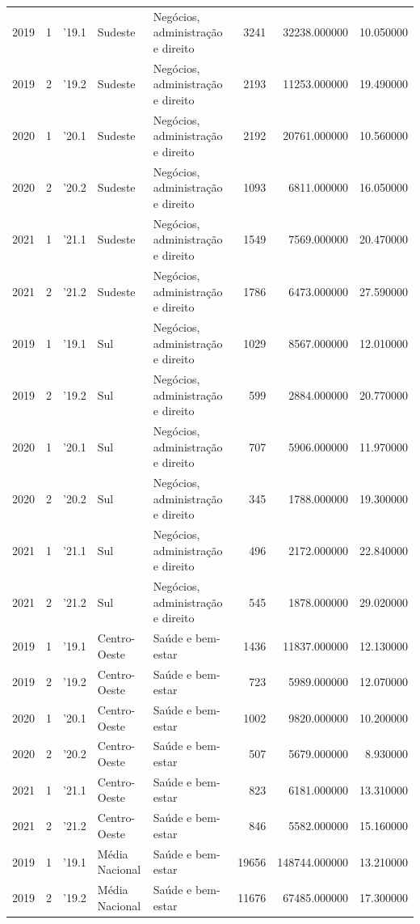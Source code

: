 \begin{longtable}{rrlllrrr}
2019 & 1 & '19.1 & Sudeste & Negócios, administração e direito & 3241 & 32238.000000 & 10.050000 \\
2019 & 2 & '19.2 & Sudeste & Negócios, administração e direito & 2193 & 11253.000000 & 19.490000 \\
2020 & 1 & '20.1 & Sudeste & Negócios, administração e direito & 2192 & 20761.000000 & 10.560000 \\
2020 & 2 & '20.2 & Sudeste & Negócios, administração e direito & 1093 & 6811.000000 & 16.050000 \\
2021 & 1 & '21.1 & Sudeste & Negócios, administração e direito & 1549 & 7569.000000 & 20.470000 \\
2021 & 2 & '21.2 & Sudeste & Negócios, administração e direito & 1786 & 6473.000000 & 27.590000 \\
2019 & 1 & '19.1 & Sul & Negócios, administração e direito & 1029 & 8567.000000 & 12.010000 \\
2019 & 2 & '19.2 & Sul & Negócios, administração e direito & 599 & 2884.000000 & 20.770000 \\
2020 & 1 & '20.1 & Sul & Negócios, administração e direito & 707 & 5906.000000 & 11.970000 \\
2020 & 2 & '20.2 & Sul & Negócios, administração e direito & 345 & 1788.000000 & 19.300000 \\
2021 & 1 & '21.1 & Sul & Negócios, administração e direito & 496 & 2172.000000 & 22.840000 \\
2021 & 2 & '21.2 & Sul & Negócios, administração e direito & 545 & 1878.000000 & 29.020000 \\
2019 & 1 & '19.1 & Centro-Oeste & Saúde e bem-estar & 1436 & 11837.000000 & 12.130000 \\
2019 & 2 & '19.2 & Centro-Oeste & Saúde e bem-estar & 723 & 5989.000000 & 12.070000 \\
2020 & 1 & '20.1 & Centro-Oeste & Saúde e bem-estar & 1002 & 9820.000000 & 10.200000 \\
2020 & 2 & '20.2 & Centro-Oeste & Saúde e bem-estar & 507 & 5679.000000 & 8.930000 \\
2021 & 1 & '21.1 & Centro-Oeste & Saúde e bem-estar & 823 & 6181.000000 & 13.310000 \\
2021 & 2 & '21.2 & Centro-Oeste & Saúde e bem-estar & 846 & 5582.000000 & 15.160000 \\
2019 & 1 & '19.1 & Média Nacional & Saúde e bem-estar & 19656 & 148744.000000 & 13.210000 \\
2019 & 2 & '19.2 & Média Nacional & Saúde e bem-estar & 11676 & 67485.000000 & 17.300000 \\

\end{longtable}
